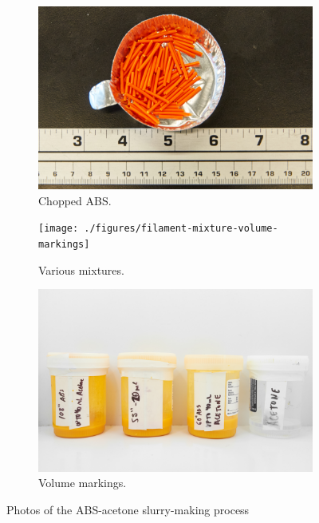 
\begin{figure}[h!]
        \centering
        \begin{subfigure}[b]{0.3\textwidth}
                \includegraphics[width=\textwidth]{./figures/filament-abs-chopped}
                \caption{Chopped ABS.}
                \label{fig:filament-abs-chopped}
        \end{subfigure}%
        \begin{subfigure}[b]{0.3\textwidth}
                \texttt{[image: ./figures/filament-mixture-volume-markings]}
                \caption{Various mixtures.}
                \label{fig:filament-mixture-volume-markings}
        \end{subfigure}
        \begin{subfigure}[b]{0.3\textwidth}
                \includegraphics[width=\textwidth]{./figures/filament-mixtures}
                \caption{Volume markings.}
                \label{fig:filament-mixtures}
        \end{subfigure}
        \caption{Photos of the ABS-acetone slurry-making process}\label{fig:slurry-making}
\end{figure}

